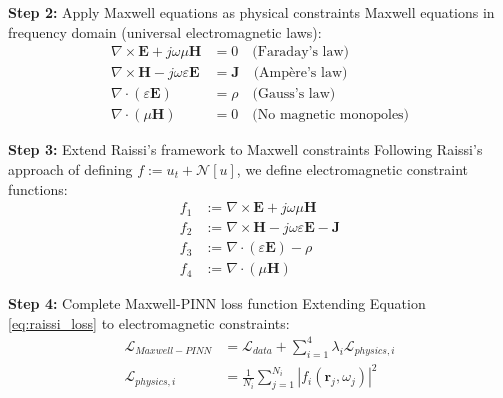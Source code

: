 \documentclass[12pt,a4paper]{article}
\begin{document}
\textbf{Step 2:} Apply Maxwell equations as physical constraints
Maxwell equations in frequency domain (universal electromagnetic laws):
\begin{align}
\nabla \times \mathbf{E} + j\omega\mu\mathbf{H} &= 0 \quad \text{(Faraday's law)} \label{eq:maxwell_faraday}\\
\nabla \times \mathbf{H} - j\omega\varepsilon\mathbf{E} &= \mathbf{J} \quad \text{(Ampère's law)} \label{eq:maxwell_ampere}\\
\nabla \cdot (\varepsilon\mathbf{E}) &= \rho \quad \text{(Gauss's law)} \label{eq:maxwell_gauss}\\
\nabla \cdot (\mu\mathbf{H}) &= 0 \quad \text{(No magnetic monopoles)} \label{eq:maxwell_monopole}
\end{align}

\textbf{Step 3:} Extend Raissi's framework to Maxwell constraints
Following Raissi's approach of defining $f := u_t + \mathcal{N}[u]$, we define electromagnetic constraint functions:
\begin{align}
f_1 &:= \nabla \times \mathbf{E} + j\omega\mu\mathbf{H} \label{eq:em_constraint_1}\\
f_2 &:= \nabla \times \mathbf{H} - j\omega\varepsilon\mathbf{E} - \mathbf{J} \label{eq:em_constraint_2}\\
f_3 &:= \nabla \cdot (\varepsilon\mathbf{E}) - \rho \label{eq:em_constraint_3}\\
f_4 &:= \nabla \cdot (\mu\mathbf{H}) \label{eq:em_constraint_4}
\end{align}

\textbf{Step 4:} Complete Maxwell-PINN loss function
Extending Equation \ref{eq:raissi_loss} to electromagnetic constraints:
\begin{align}
\mathcal{L}_{Maxwell-PINN} &= \mathcal{L}_{data} + \sum_{i=1}^{4} \lambda_i \mathcal{L}_{physics,i} \label{eq:maxwell_pinn_complete}\\
\mathcal{L}_{physics,i} &= \frac{1}{N_i} \sum_{j=1}^{N_i} |f_i(\mathbf{r}_j, \omega_j)|^2 \label{eq:maxwell_physics_loss}
\end{align}
\end{document}
